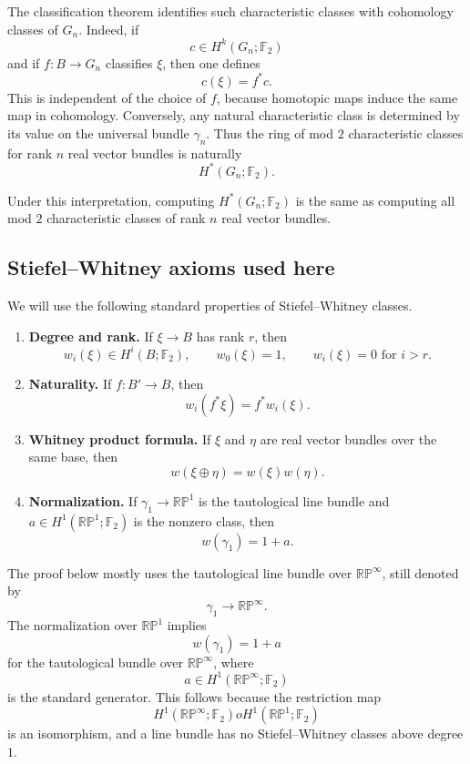 \documentclass[11pt]{article}
\newcommand{\F}{\mathbb F}
\newcommand{\RP}{\mathbb{RP}}
\theoremstyle{plain}
\theoremstyle{definition}
\numberwithin{equation}{section}
\begin{document}
The classification theorem identifies such characteristic classes with cohomology classes of $G_n$.  Indeed, if
\[
  c\in H^k(G_n;\F_2)
\]
and if $f:B\to G_n$ classifies $\xi$, then one defines
\[
  c(\xi)=f^*c.
\]
This is independent of the choice of $f$, because homotopic maps induce the same map in cohomology.  Conversely, any natural characteristic class is determined by its value on the universal bundle $\gamma_n$.  Thus the ring of mod $2$ characteristic classes for rank $n$ real vector bundles is naturally
\[
  H^*(G_n;\F_2).
\]

Under this interpretation, computing $H^*(G_n;\F_2)$ is the same as computing all mod $2$ characteristic classes of rank $n$ real vector bundles.

\subsection{Stiefel--Whitney axioms used here}

We will use the following standard properties of Stiefel--Whitney classes.

\begin{enumerate}
  \item \textbf{Degree and rank.}  If $\xi\to B$ has rank $r$, then
  \[
    w_i(\xi)\in H^i(B;\F_2),
    \qquad
    w_0(\xi)=1,
    \qquad
    w_i(\xi)=0 \text{ for } i>r.
  \]

  \item \textbf{Naturality.}  If $f:B'\to B$, then
  \[
    w_i(f^*\xi)=f^*w_i(\xi).
  \]

  \item \textbf{Whitney product formula.}  If $\xi$ and $\eta$ are real vector bundles over the same base, then
  \[
    w(\xi\oplus\eta)=w(\xi)w(\eta).
  \]

  \item \textbf{Normalization.}  If $\gamma_1\to\RP^1$ is the tautological line bundle and $a\in H^1(\RP^1;\F_2)$ is the nonzero class, then
  \[
    w(\gamma_1)=1+a.
  \]
\end{enumerate}

The proof below mostly uses the tautological line bundle over $\RP^\infty$, still denoted by
\[
  \gamma_1\longrightarrow \RP^\infty.
\]
The normalization over $\RP^1$ implies
\[
  w(\gamma_1)=1+a
\]
for the tautological bundle over $\RP^\infty$, where
\[
  a\in H^1(\RP^\infty;\F_2)
\]
is the standard generator.  This follows because the restriction map
\[
  H^1(\RP^\infty;\F_2)	o H^1(\RP^1;\F_2)
\]
is an isomorphism, and a line bundle has no Stiefel--Whitney classes above degree $1$.
\end{document}
